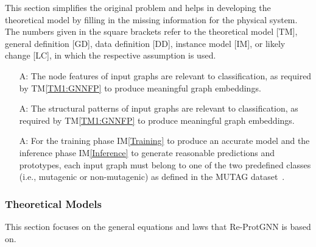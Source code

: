 \documentclass[12pt]{article}
\newcommand{\tref}[1]{TM\ref{#1}}
\newcounter{assumpnum} %
\newcommand{\iref}[1]{IM\ref{#1}}
\begin{document}
This section simplifies the original problem and helps in developing the
theoretical model by filling in the missing information for the physical system.
The numbers given in the square brackets refer to the theoretical model [TM],
general definition [GD], data definition [DD], instance model [IM], or likely
change [LC], in which the respective assumption is used.

\begin{itemize}

\item[A\refstepcounter{assumpnum}\theassumpnum \label{A1}:]
  The node features of input graphs are relevant to classification, as required by \tref{TM1:GNNFP} to produce meaningful graph embeddings.

\item[A\refstepcounter{assumpnum}\theassumpnum \label{A2}:]
  The structural patterns of input graphs are relevant to classification, as required by \tref{TM1:GNNFP} to produce meaningful graph embeddings.

\item[A\refstepcounter{assumpnum}\theassumpnum \label{A3}:]
    For the training phase \iref{Training} to produce an accurate model and the inference phase \iref{Inference} to generate reasonable predictions and prototypes, each input graph must belong to one of the two predefined classes (i.e., mutagenic or non-mutagenic) as defined in the MUTAG dataset~\cite{debnath1991structure}.

    
\end{itemize}

\subsubsection{Theoretical Models}\label{sec_theoretical}

This section focuses on the general equations and laws that Re-ProtGNN is based
on.
\end{document}
